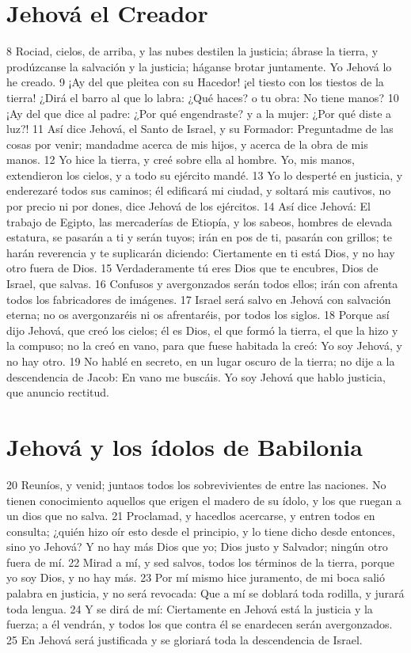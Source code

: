 \section*{Jehová el Creador}

8 Rociad, cielos, de arriba, y las nubes destilen la justicia; ábrase la tierra, y prodúzcanse la salvación y la justicia; háganse brotar juntamente. Yo Jehová lo he creado.
9 ¡Ay del que pleitea con su Hacedor! ¡el tiesto con los tiestos de la tierra! ¿Dirá el barro al que lo labra: ¿Qué haces? o tu obra: No tiene manos?
10 ¡Ay del que dice al padre: ¿Por qué engendraste? y a la mujer: ¿Por qué diste a luz?!
11 Así dice Jehová, el Santo de Israel, y su Formador: Preguntadme de las cosas por venir; mandadme acerca de mis hijos, y acerca de la obra de mis manos.
12 Yo hice la tierra, y creé sobre ella al hombre. Yo, mis manos, extendieron los cielos, y a todo su ejército mandé.
13 Yo lo desperté en justicia, y enderezaré todos sus caminos; él edificará mi ciudad, y soltará mis cautivos, no por precio ni por dones, dice Jehová de los ejércitos.
14 Así dice Jehová: El trabajo de Egipto, las mercaderías de Etiopía, y los sabeos, hombres de elevada estatura, se pasarán a ti y serán tuyos; irán en pos de ti, pasarán con grillos; te harán reverencia y te suplicarán diciendo: Ciertamente en ti está Dios, y no hay otro fuera de Dios.
15 Verdaderamente tú eres Dios que te encubres, Dios de Israel, que salvas.
16 Confusos y avergonzados serán todos ellos; irán con afrenta todos los fabricadores de imágenes.
17 Israel será salvo en Jehová con salvación eterna; no os avergonzaréis ni os afrentaréis, por todos los siglos.
18 Porque así dijo Jehová, que creó los cielos; él es Dios, el que formó la tierra, el que la hizo y la compuso; no la creó en vano, para que fuese habitada la creó: Yo soy Jehová, y no hay otro.
19 No hablé en secreto, en un lugar oscuro de la tierra; no dije a la descendencia de Jacob: En vano me buscáis. Yo soy Jehová que hablo justicia, que anuncio rectitud.

\section*{Jehová y los ídolos de Babilonia}

20 Reuníos, y venid; juntaos todos los sobrevivientes de entre las naciones. No tienen conocimiento aquellos que erigen el madero de su ídolo, y los que ruegan a un dios que no salva.
21 Proclamad, y hacedlos acercarse, y entren todos en consulta; ¿quién hizo oír esto desde el principio, y lo tiene dicho desde entonces, sino yo Jehová? Y no hay más Dios que yo; Dios justo y Salvador; ningún otro fuera de mí.
22 Mirad a mí, y sed salvos, todos los términos de la tierra, porque yo soy Dios, y no hay más.
23 Por mí mismo hice juramento, de mi boca salió palabra en justicia, y no será revocada: Que a mí se doblará toda rodilla, y jurará toda lengua. 
24 Y se dirá de mí: Ciertamente en Jehová está la justicia y la fuerza; a él vendrán, y todos los que contra él se enardecen serán avergonzados.
25 En Jehová será justificada y se gloriará toda la descendencia de Israel.

